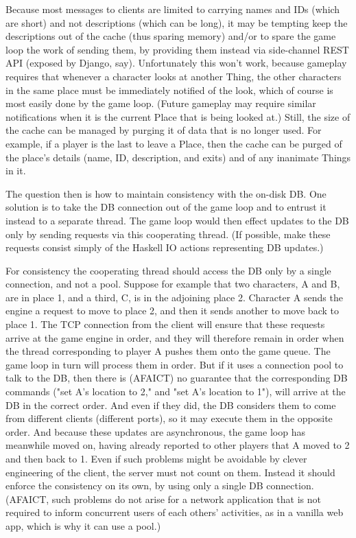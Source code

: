 Because most messages to clients are limited to carrying names and IDs
(which are short) and not descriptions (which can be long), it may be tempting
keep the descriptions out of the cache (thus sparing memory) and/or to spare the
game loop the work of sending them, by providing them instead via side-channel
REST API (exposed by Django, say). Unfortunately this won't work, because
gameplay requires that whenever a character looks at another Thing, the other
characters in the same place must be immediately notified of the look, which
of course is most easily done by the game loop.
(Future gameplay may require similar notifications when
it is the current Place that is being looked at.) Still, the size of the cache
can be managed by purging it of data that is no longer used. For example, if
a player is the last to leave a Place, then the cache can be purged of the
place's details (name, ID, description, and exits) and of any inanimate Things
in it.

The question then is how to maintain consistency with the on-disk DB. One
solution is to take the DB connection out of the game loop and to entrust
it instead to a separate thread. The game loop would then effect updates
to the DB only by sending requests via this cooperating thread. (If possible,
make these requests consist simply of the Haskell IO actions representing DB
updates.)

For consistency the cooperating thread should access the DB only
by a single connection, and not a pool. Suppose for example that two
characters, A and B, are in place 1, and a third, C, is in the adjoining
place 2. Character A sends the engine a request to move to place 2, and then
it sends another to move back to place 1. The TCP connection from the client
will ensure that these requests arrive at the game engine in order, and they
will therefore remain in order when the thread corresponding to player A pushes
them onto the game queue. The game loop in turn will process them in order.
But if it uses a connection pool to talk to the DB, then there is (AFAICT)
no guarantee that the corresponding DB commands ("set A's location to 2," and
"set A's location to 1"), will arrive at the DB in the correct order. And even
if they did, the DB considers them to come from different clients (different
ports), so it may execute them in the opposite order. And because these
updates are asynchronous, the game loop has meanwhile moved on, having already
reported to other players that A moved to 2 and then back to 1. Even if such
problems might be avoidable by clever engineering of the client, the server
must not count on them. Instead it should enforce the consistency on its own,
by using only a single DB connection. (AFAICT,
such problems do not arise for a network application that is not required to
inform concurrent users of each others' activities, as in a vanilla web app,
which is why it can use a pool.)